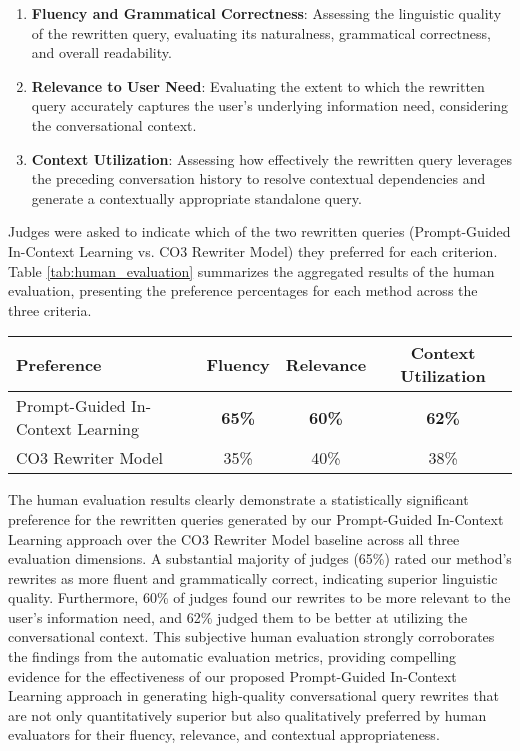\begin{enumerate}
    \item \textbf{Fluency and Grammatical Correctness}:  Assessing the linguistic quality of the rewritten query, evaluating its naturalness, grammatical correctness, and overall readability.
    \item \textbf{Relevance to User Need}:  Evaluating the extent to which the rewritten query accurately captures the user's underlying information need, considering the conversational context.
    \item \textbf{Context Utilization}:  Assessing how effectively the rewritten query leverages the preceding conversation history to resolve contextual dependencies and generate a contextually appropriate standalone query.
\end{enumerate}

Judges were asked to indicate which of the two rewritten queries (Prompt-Guided In-Context Learning vs. CO3 Rewriter Model) they preferred for each criterion.  Table \ref{tab:human_evaluation} summarizes the aggregated results of the human evaluation, presenting the preference percentages for each method across the three criteria.

\begin{table*}[!t]
    \centering
    \caption{Human Evaluation Results: Preference Percentage for Prompt-Guided In-Context Learning vs. CO3 Rewriter Model}
    \label{tab:human_evaluation}
    \begin{tabular}{lccc}
        \toprule
        Preference & Fluency & Relevance & Context Utilization \\
        \midrule
        Prompt-Guided In-Context Learning & \textbf{65\%} & \textbf{60\%} & \textbf{62\%} \\
        CO3 Rewriter Model & 35\% & 40\% & 38\% \\
        \bottomrule
    \end{tabular}
\end{table*}

The human evaluation results clearly demonstrate a statistically significant preference for the rewritten queries generated by our Prompt-Guided In-Context Learning approach over the CO3 Rewriter Model baseline across all three evaluation dimensions.  A substantial majority of judges (65\%) rated our method's rewrites as more fluent and grammatically correct, indicating superior linguistic quality.  Furthermore, 60\% of judges found our rewrites to be more relevant to the user's information need, and 62\% judged them to be better at utilizing the conversational context.  This subjective human evaluation strongly corroborates the findings from the automatic evaluation metrics, providing compelling evidence for the effectiveness of our proposed Prompt-Guided In-Context Learning approach in generating high-quality conversational query rewrites that are not only quantitatively superior but also qualitatively preferred by human evaluators for their fluency, relevance, and contextual appropriateness.


